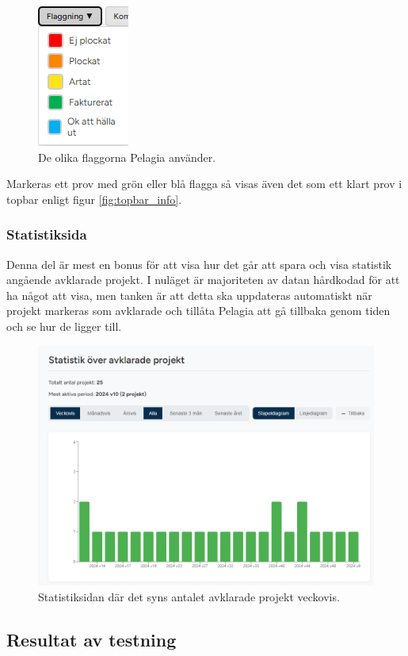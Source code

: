 \begin{figure}[H]
    \centering
    \includegraphics[width=0.2\linewidth]{images/workspace_flaggning.png}
    \caption{De olika flaggorna Pelagia använder.}
    \label{fig:workspace_flag}
\end{figure}
\noindent Markeras ett prov med grön eller blå flagga så visas även det som ett klart prov i topbar enligt figur \ref{fig:topbar_info}.

\subsubsection{Statistiksida}
Denna del är mest en bonus för att visa hur det går att spara och visa statistik angående avklarade projekt.
I nuläget är majoriteten av datan hårdkodad för att ha något att visa, men tanken är att detta ska uppdateras automatiskt när projekt
markeras som avklarade och tillåta Pelagia att gå tillbaka genom tiden och se hur de ligger till.

\begin{figure}[H]
    \centering
    \includegraphics[width=1\linewidth]{images/statistik.png}
    \caption{Statistiksidan där det syns antalet avklarade projekt veckovis.}
\end{figure}
\subsection{Resultat av testning}